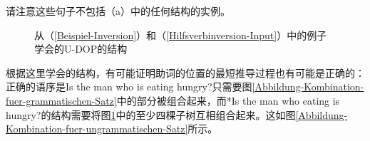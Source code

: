 \noindent
请注意这些句子不包括（a）中的任何结构的实例。
\begin{figure}
\hfill
{}
\hfill
{}
\hfill\mbox{}
\caption{\label{Abbildung-Strukturen-fuer-Fragen-und-RS}从（\ref{Beispiel-Inversion}）和（\ref{Hilfsverbinversion-Input}）中的例子学会的U-DOP的结构}
\end{figure}%
根据这里学会的结构，有可能证明助词的位置的最短推导过程也有可能是正确的：正确的语序是Is the man who is eating
  hungry?只需要图\vref{Abbildung-Kombination-fuer-grammatischen-Satz}中的部分被组合起来，而*Is the man who eating is hungry?的结构需要将图\ref{Abbildung-Strukturen-fuer-Fragen-und-RS}中的至少四棵子树互相组合起来。这如图\vref{Abbildung-Kombination-fuer-ungrammatischen-Satz}所示。

